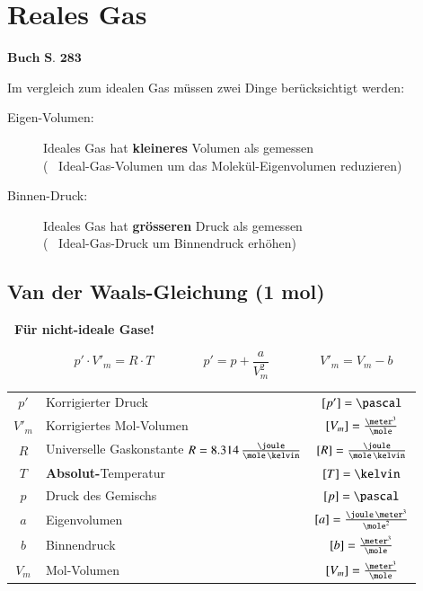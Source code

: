 \section{Reales Gas}
\begin{flushright}
	$\boxed{\textbf{Buch S. 283}}$
\end{flushright}


Im vergleich zum idealen Gas müssen zwei Dinge berücksichtigt werden:

\medskip

\begin{description}
	\item[Eigen-Volumen:] Ideales Gas hat \textbf{kleineres} Volumen als gemessen \\
		( \textrightarrow\ Ideal-Gas-Volumen um das Molekül-Eigenvolumen reduzieren)
	\item[Binnen-Druck:] Ideales Gas hat \textbf{grösseren} Druck als gemessen \\
		( \textrightarrow\ Ideal-Gas-Druck um Binnendruck erhöhen) 
\end{description}


\subsection{Van der Waals-Gleichung (1 mol)}

\textbf{\textrightarrow\ Für nicht-ideale Gase!} 

$$ \boxed{ p' \cdot V'_m = R \cdot T } \qquad \qquad \boxed{ p' = p + \frac{a}{V_m^2} } \qquad \qquad \boxed{ V'_m = V_m - b } $$


\renewcommand{\arraystretch}{1.3}
\begin{tabular}{c l c}
	$p'$ 	& Korrigierter Druck 														& $[p'] = \pascal$ 								\\
	$V'_m$ 	& Korrigiertes Mol-Volumen 													& $[V_m] = \frac{\meter^3}{\mole}$ 				\\
	$R$		& Universelle Gaskonstante $R = 8.314 \, \frac{\joule}{\mole \, \kelvin}$ 	& $[R] = \frac{\joule}{\mole \, \kelvin}$ 		\\
	$T$ 	& \textbf{Absolut-}Temperatur		 										& $[T] = \kelvin$ 								\\
	$p$ 	& Druck des Gemischs 														& $[p] = \pascal$ 								\\
	$a$ 	& Eigenvolumen 																& $[a] = \frac{\joule \, \meter^3}{\mole^2}$ 	\\
	$b$ 	& Binnendruck 																& $[b] = \frac{\meter^3}{\mole}$ 				\\
	$V_m$ 	& Mol-Volumen 																& $[V_m] = \frac{\meter^3}{\mole}$
\end{tabular}
\renewcommand{\arraystretch}{1}


